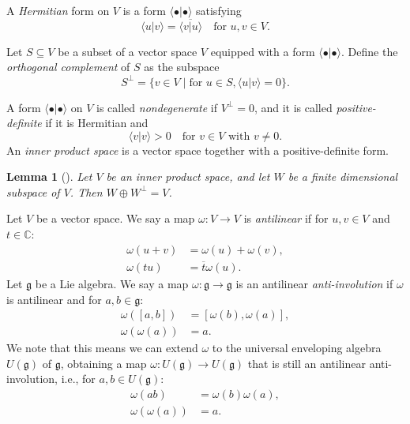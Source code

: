 \documentclass[a4paper, 12pt, reqno]{amsart}
\newtheorem{lemma}[theorem]{Lemma}
\theoremstyle{remark}
\numberwithin{equation}{subsection}
\begin{document}
A \emph{Hermitian} form on $V$ is a form $\langle\bullet| \bullet\rangle$ satisfying
\begin{equation*}
  \langle u| v\rangle = \overline{\langle v| u\rangle} \quad \text{for }u, v \in V.
\end{equation*}

Let $S \subseteq V$ be a subset of a vector space $V$ equipped with a form $\langle\bullet| \bullet\rangle$.
Define the \emph{orthogonal complement} of $S$ as the subspace
\begin{equation*}
  S^{\perp} = \{v \in V \mid \text{for }u \in S, \langle u| v\rangle = 0\}.
\end{equation*}

A form $\langle\bullet| \bullet\rangle$ on $V$ is called \emph{nondegenerate} if $V^{\perp} = 0$, and it is called \emph{positive-definite} if it is Hermitian and
\begin{equation*}
  \langle v| v\rangle > 0 \quad \text{for }v \in V\text{ with }v \neq 0.
\end{equation*}
An \emph{inner product space} is a vector space together with a positive-definite form.

\begin{lemma}[{\cite[\S8.2 Theorem 5]{hoffman_linear_1971}}]
  \label{lmm:16}
  Let $V$ be an inner product space, and let $W$ be a finite dimensional subspace of $V$.
  Then $W \oplus W^{\perp} = V$.
\end{lemma}

Let $V$ be a  vector space.
We say a map $\omega: V \to V$ is \emph{antilinear} if for $u, v \in V$ and $t \in \mathbb{C}$:
\begin{align*}
  \omega(u + v) &= \omega(u) + \omega(v), \\
  \omega(tu) &= \overline{t}\omega(u).
\end{align*}
Let $\mathfrak{g}$ be a Lie algebra.
We say a map $\omega: \mathfrak{g} \to \mathfrak{g}$ is an antilinear \emph{anti-involution} if $\omega$ is antilinear and for $a, b \in \mathfrak{g}$:
\begin{align*}
  \omega([a, b]) &= [\omega(b), \omega(a)], \\
  \omega(\omega(a)) &= a.
\end{align*}
We note that this means we can extend $\omega$ to the universal enveloping algebra $U(\mathfrak{g})$ of $\mathfrak{g}$, obtaining a map $\omega: U(\mathfrak{g}) \to U(\mathfrak{g})$ that is still an antilinear anti-involution, i.e., for $a, b \in U(\mathfrak{g})$:
\begin{align*}
  \omega(ab) &= \omega(b)\omega(a), \\
  \omega(\omega(a)) &= a.
\end{align*}
\end{document}
